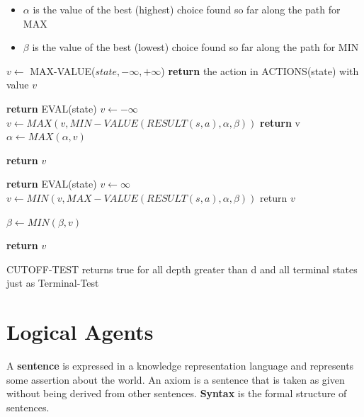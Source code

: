 \documentclass{article}
\begin{document}
\begin{itemize}
    \item $\alpha$ is the value of the best (highest) choice found so far along the path for MAX
    \item $\beta$ is the value of the best (lowest) choice found so far along the path for MIN
\end{itemize}

\begin{algorithm}
\begin{algorithmic}

    \State $v \leftarrow$ MAX-VALUE($state,-\infty , +\infty$)
    \State \textbf{return} the action in ACTIONS(state) with value $v$
\EndProcedure \newline

        \State \textbf{return} EVAL(state)
    \EndIf
    \State $v \leftarrow -\infty$
        $v \leftarrow MAX(v,MIN-VALUE(RESULT(s,a),\alpha,\beta))$
        \textbf{return} v
        \EndIf
        \State $\alpha \leftarrow MAX(\alpha,v)$
    \EndFor

    \State \textbf{return} $v$ 
\EndProcedure \newline

        \State \textbf{return} EVAL(state)
        \State $v \leftarrow \infty$
    \EndIf
    \State $v \leftarrow MIN(v,MAX-VALUE(RESULT(s,a),\alpha,\beta))$
        \State return $v$
       
    \EndIf
    \State $\beta \leftarrow MIN(\beta, v)$
    \EndFor
    
    \State \textbf{return} $v$

\EndProcedure

\end{algorithmic}
\end{algorithm}


CUTOFF-TEST returns true for all depth greater than d and all terminal states just as Terminal-Test

\section{Logical Agents}

A \textbf{sentence} is expressed in a knowledge representation language and represents some assertion about the world. An axiom is a sentence that is taken as given without being derived from other sentences. \textbf{Syntax} is the formal structure of sentences. 
\end{document}
